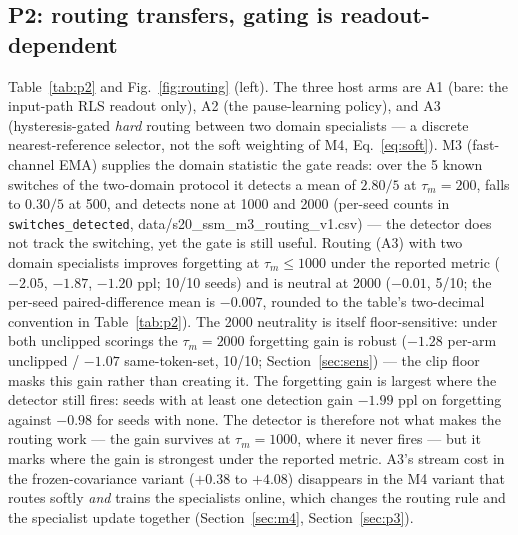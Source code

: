 \documentclass[preprint,12pt]{elsarticle}
\begin{document}
\subsection{P2: routing transfers, gating is readout-dependent}
\label{sec:p2}

Table~\ref{tab:p2} and Fig.~\ref{fig:routing} (left). The three host
arms are A1 (bare: the input-path RLS readout only), A2 (the
pause-learning policy), and A3 (hysteresis-gated \emph{hard} routing
between two domain specialists --- a discrete nearest-reference
selector, not the soft weighting of M4, Eq.~\ref{eq:soft}). M3
(fast-channel EMA) supplies the domain statistic the
gate reads: over the 5 known switches of the two-domain protocol it
detects a mean of $2.80/5$ at $\tau_m{=}200$, falls to $0.30/5$ at 500,
and detects none at 1000 and 2000 (per-seed counts in
\texttt{switches\_detected}, data/s20\_ssm\_m3\_routing\_v1.csv) --- the
detector does not track the switching, yet the gate is still useful.
Routing (A3) with two domain specialists improves forgetting at
$\tau_m \le 1000$ under the reported metric ($-2.05$, $-1.87$, $-1.20$
ppl; 10/10 seeds) and is neutral at 2000 ($-0.01$, 5/10; the per-seed
paired-difference mean is $-0.007$, rounded to the table's two-decimal
convention in Table~\ref{tab:p2}). The 2000 neutrality is itself
floor-sensitive: under both unclipped scorings the $\tau_m{=}2000$
forgetting gain is robust ($-1.28$ per-arm unclipped / $-1.07$
same-token-set, 10/10; Section~\ref{sec:sens}) --- the clip floor
masks this gain rather than creating it.
The forgetting gain is largest where the detector
still fires: seeds with at least one detection gain $-1.99$ ppl on
forgetting against $-0.98$ for seeds with none. The detector is
therefore not what makes the routing work --- the gain survives at
$\tau_m{=}1000$, where it never fires --- but it marks where the gain is
strongest under the reported metric. A3's stream
cost in the frozen-covariance variant ($+0.38$ to $+4.08$) disappears in
the M4 variant that routes softly \emph{and} trains the specialists
online, which changes the routing rule and the specialist update
together (Section~\ref{sec:m4}, Section~\ref{sec:p3}).
\end{document}
